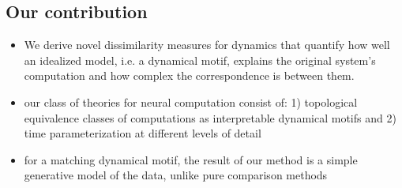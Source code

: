 \documentclass{article}
\theoremstyle{definition} \newtheorem{definition}{Definition}  \newtheorem{example}{Example}
\theoremstyle{remark} \newtheorem{remark}{Remark}
\newcounter{ct}
\begin{document}


\subsection{Our contribution}\label{sec:contribution}
\begin{itemize}
\item We derive novel dissimilarity measures for dynamics that quantify how well an idealized model, i.e. a dynamical motif, explains the original system’s computation and how complex the correspondence is between them.
\item our class of theories for neural computation consist of: 1) topological equivalence classes of computations as interpretable dynamical motifs and 2) time parameterization at different levels of detail
\item for a matching dynamical motif, the result of our method is a simple generative model of the data, unlike pure comparison methods
\end{itemize}


\end{document}
